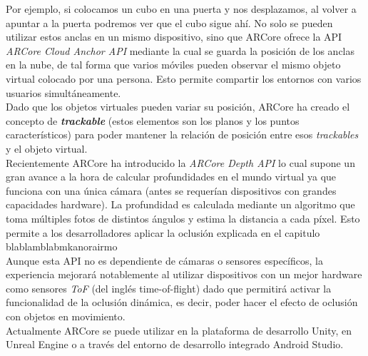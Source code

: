 Por ejemplo, si colocamos un cubo en una puerta y nos desplazamos, al volver a apuntar a la puerta podremos ver que el cubo sigue ahí. No solo se pueden utilizar estos anclas en un mismo dispositivo, sino que ARCore ofrece la API \textit{ARCore Cloud Anchor API} mediante la cual se guarda la posición de los anclas en la nube, de tal forma que varios móviles pueden observar el mismo objeto virtual colocado por una persona. Esto permite compartir los entornos con varios usuarios simultáneamente.\\

Dado que los objetos virtuales pueden variar su posición, ARCore ha creado el concepto de \textit{\textbf{trackable}} (estos elementos son los planos y los puntos característicos) para poder mantener la relación de posición entre esos \textit{trackables} y el objeto virtual.\\


Recientemente ARCore ha introducido la \textit{ARCore Depth API} lo cual supone un gran avance a la hora de calcular profundidades en el mundo virtual ya que funciona con una única cámara (antes se requerían dispositivos con grandes capacidades hardware). La profundidad es calculada mediante un algoritmo que toma múltiples fotos de distintos ángulos y estima la distancia a cada píxel. Esto permite a los desarrolladores aplicar la oclusión explicada en el capitulo blablamblabmkanorairmo\\

Aunque esta API no es dependiente de cámaras o sensores específicos, la experiencia mejorará notablemente al utilizar dispositivos con un mejor hardware como sensores \textit{ToF} (del inglés time-of-flight) dado que permitirá activar la funcionalidad de la oclusión dinámica, es decir, poder hacer el efecto de oclusión con objetos en movimiento.\\

Actualmente ARCore se puede utilizar en la plataforma de desarrollo Unity, en Unreal Engine o a través del entorno de desarrollo integrado Android Studio.





